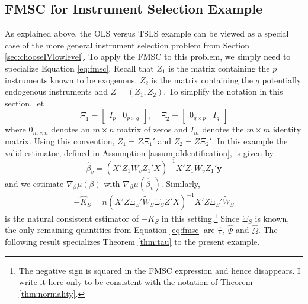 \subsection{FMSC for Instrument Selection Example}
\label{sec:chooseIVFMSC}
As explained above, the OLS versus TSLS example can be viewed as a special case of the more general instrument selection problem from Section \ref{sec:chooseIVlowlevel}.
To apply the FMSC to this problem, we simply need to specialize Equation \ref{eq:fmsc}.
Recall that $Z_1$ is the matrix containing the $p$ instruments known to be exogenous, $Z_2$ is the matrix containing the $q$ potentially endogenous instruments and $Z = (Z_1, Z_2)$.
To simplify the notation in this section, let
\begin{equation}
\label{eq:xi12}
\Xi_1 = \left[\begin{array}{cc} I_{p} & 0_{p \times q}  \end{array}\right], \quad
    \Xi_2 = \left[ \begin{array}{cc}
              0_{q \times p}& I_{q}
            \end{array}\right]	
\end{equation}
where $0_{m\times n}$ denotes an $m\times n$ matrix of zeros and $I_m$ denotes the $m\times m$ identity matrix.
Using this convention, $Z_1 = Z \Xi_1'$ and $Z_2 = Z \Xi_2'$.
In this example the valid estimator, defined in Assumption \ref{assump:Identification}, is given by
\begin{equation}
\label{eq:betav}
\widehat{\beta}_v = \left(X'Z_1 \widetilde{W}_v Z_1' X\right)^{-1}X'Z_1 \widetilde{W}_v Z_1' \mathbf{y}	
\end{equation}
and we estimate $\nabla_\beta \mu(\beta)$ with $\nabla_\beta \mu(\widehat{\beta}_v)$.  
Similarly, 
$$-\widehat{K}_S = n\left(X'Z \Xi_S' \widetilde{W}_S \Xi_S Z' X\right)^{-1}X' Z \Xi_S' \widetilde{W}_S$$
is the natural consistent estimator of $-K_S$ in this setting.\footnote{The negative sign is squared in the FMSC expression and hence disappears. I write it here only to be consistent with the notation of Theorem \ref{thm:normality}.}
Since $\Xi_S$ is known, the only remaining quantities from Equation \ref{eq:fmsc} are $\widehat{\boldsymbol{\tau}}$, $\widehat{\Psi}$ and $\widehat{\Omega}$. 
The following result specializes Theorem \ref{thm:tau} to the present example.
